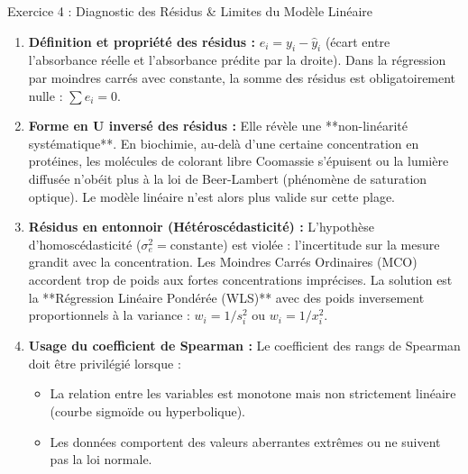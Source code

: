 \documentclass[11pt,a4paper]{article}
\begin{document}
\begin{solutionbox}{Exercice 4 : Diagnostic des Résidus \& Limites du Modèle Linéaire}
\begin{enumerate}[label=\textbf{\alph*.}]
  \item \textbf{Définition et propriété des résidus :}
  $e_i = y_i - \hat{y}_i$ (écart entre l'absorbance réelle et l'absorbance prédite par la droite). Dans la régression par moindres carrés avec constante, la somme des résidus est obligatoirement nulle : $\sum e_i = 0$.

  \item \textbf{Forme en U inversé des résidus :}
  Elle révèle une **non-linéarité systématique**. En biochimie, au-delà d'une certaine concentration en protéines, les molécules de colorant libre Coomassie s'épuisent ou la lumière diffusée n'obéit plus à la loi de Beer-Lambert (phénomène de saturation optique). Le modèle linéaire n'est alors plus valide sur cette plage.

  \item \textbf{Résidus en entonnoir (Hétéroscédasticité) :}
  L'hypothèse d'homoscédasticité ($\sigma_e^2 = \text{constante}$) est violée : l'incertitude sur la mesure grandit avec la concentration. Les Moindres Carrés Ordinaires (MCO) accordent trop de poids aux fortes concentrations imprécises. La solution est la **Régression Linéaire Pondérée (WLS)** avec des poids inversement proportionnels à la variance : $w_i = 1 / s_i^2$ ou $w_i = 1 / x_i^2$.

  \item \textbf{Usage du coefficient de Spearman :}
  Le coefficient des rangs de Spearman doit être privilégié lorsque :
  \begin{itemize}
    \item La relation entre les variables est monotone mais non strictement linéaire (courbe sigmoïde ou hyperbolique).
    \item Les données comportent des valeurs aberrantes extrêmes ou ne suivent pas la loi normale.
  \end{itemize}
\end{enumerate}
\end{solutionbox}
\end{document}

